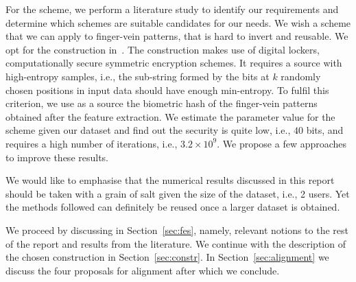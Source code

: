For the \fe scheme, we perform a literature study to identify our requirements and determine which schemes are suitable candidates for our needs. We wish a scheme that we can apply to finger-vein patterns, that is hard to invert and reusable.  We opt for the construction in~\cite{reusablefe}. The construction makes use of digital lockers, computationally secure symmetric encryption schemes. It requires a source with high-entropy samples, i.e., the sub-string formed by the bits at $k$ randomly chosen positions in input data should have enough min-entropy. To fulfil this criterion, we use as a source the biometric hash of the finger-vein patterns obtained after the feature extraction.
We estimate the parameter value for the scheme given our dataset and find out the security is quite low, i.e., $40$ bits, and requires a high number of iterations, i.e., $3.2 \times 10^9$. We propose a few approaches to improve these results. 

We would like to emphasise that the numerical results discussed in this report should be taken with a grain of salt given the size of the dataset, i.e., 2 users. Yet the methods followed can definitely be reused once a larger dataset is obtained.

We proceed by discussing \fes in Section~\ref{sec:fes}, namely, relevant notions to the rest of the report and results from the literature. We continue with the description of the chosen \rfe construction in Section~\ref{sec:constr}. In Section~\ref{sec:alignment} we discuss the four proposals for alignment after which we conclude.
